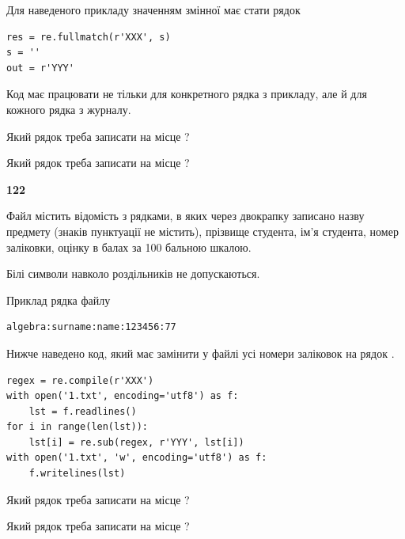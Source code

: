 Для наведеного прикладу значенням змінної  має стати рядок 



\begin{verbatim}
res = re.fullmatch(r'XXX', s)
s = ''
out = r'YYY'
\end{verbatim}


Код має працювати не тільки для конкретного рядка з прикладу, але й для кожного рядка з журналу.




Який рядок треба записати на місце  ?\par
\vspace{5mm}


Який рядок треба записати на місце  ?\par


\newpage

{\begin {center}\textbf{ 122}\end {center}}\par
Файл  містить відомість з рядками, в яких через двокрапку записа\-но назву предмету (знаків пунктуації не містить), прізвище студента, ім'я студента, номер залі\-ков\-ки, оцінку в балах за 100 бальною шкалою.

Білі символи навколо роздільників не допускаються.

Приклад рядка файлу



\begin{verbatim}
algebra:surname:name:123456:77
\end{verbatim}


Нижче наведено код, який має замінити у файлі усі номери заліковок на рядок \code{***}.



\begin{verbatim}
regex = re.compile(r'XXX')
with open('1.txt', encoding='utf8') as f:
    lst = f.readlines()
for i in range(len(lst)):
    lst[i] = re.sub(regex, r'YYY', lst[i])
with open('1.txt', 'w', encoding='utf8') as f:
    f.writelines(lst)
\end{verbatim}







Який рядок треба записати на місце  ?\par
\vspace{5mm}


Який рядок треба записати на місце  ?\par


